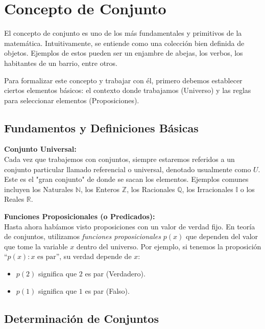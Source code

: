 \section{Concepto de Conjunto}

El concepto de conjunto es uno de los más fundamentales y primitivos de la matemática. Intuitivamente, se entiende como una colección bien definida de objetos. Ejemplos de estos pueden ser un enjambre de abejas, los verbos, los habitantes de un barrio, entre otros.

Para formalizar este concepto y trabajar con él, primero debemos establecer ciertos elementos básicos: el contexto donde trabajamos (Universo) y las reglas para seleccionar elementos (Proposiciones).

\subsection{Fundamentos y Definiciones Básicas}

\textbf{Conjunto Universal:} \\
Cada vez que trabajemos con conjuntos, siempre estaremos referidos a un conjunto particular llamado referencial o universal, denotado usualmente como $U$. Este es el "gran conjunto" de donde se sacan los elementos. Ejemplos comunes incluyen los Naturales $\mathbb{N}$, los Enteros $\mathbb{Z}$, los Racionales $\mathbb{Q}$, los Irracionales $\mathbb{I}$ o los Reales $\mathbb{R}$.

\vspace{0.3cm}

\textbf{Funciones Proposicionales (o Predicados):} \\
Hasta ahora habíamos visto proposiciones con un valor de verdad fijo. En teoría de conjuntos, utilizamos \textit{funciones proposicionales} $p(x)$ que dependen del valor que tome la variable $x$ dentro del universo.
Por ejemplo, si tenemos la proposición ``$p(x): x \text{ es par}$'', su verdad depende de $x$:
\begin{itemize}
    \item $p(2)$ significa que $2$ es par (Verdadero).
    \item $p(1)$ significa que $1$ es par (Falso).
\end{itemize}

\subsection{Determinación de Conjuntos}

